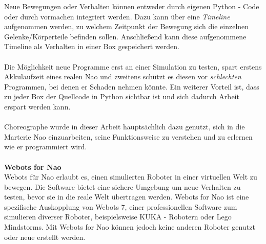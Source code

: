 Neue Bewegungen oder Verhalten können entweder durch eigenen Python - Code oder durch vormachen integriert werden. Dazu kann über eine \textit{Timeline} aufgenommen werden, zu welchem Zeitpunkt der Bewegung sich die einzelnen Gelenke/Körperteile befinden sollen. Anschließend kann diese aufgenommene Timeline als Verhalten in einer Box gespeichert werden.
\\
\\
Die Möglichkeit neue Programme erst an einer Simulation zu testen, spart erstens Akkulaufzeit eines realen Nao und zweitens schützt es diesen vor \textit{schlechten} Programmen, bei denen er Schaden nehmen könnte. Ein weiterer Vorteil ist, dass zu jeder Box der Quellcode in Python sichtbar ist und sich dadurch Arbeit erspart werden kann.
\\
\\
Choreographe wurde in dieser Arbeit hauptsächlich dazu genutzt, sich in die Marterie Nao einzuarbeiten, seine Funktionsweise zu verstehen und zu erlernen wie er programmiert wird.
\\
\\
\textbf{Webots for Nao}
\\
Webots für Nao erlaubt es, einen simulierten Roboter in einer virtuellen Welt zu bewegen. Die Software bietet eine sichere Umgebung um neue Verhalten zu testen, bevor sie in die reale Welt übertragen werden. Webots for Nao ist eine spezifische Auskopplung von Webots 7, einer professionellen Software zum simulieren diverser Roboter, beispielsweise KUKA - Robotern oder Lego Mindstorms. Mit Webots for Nao können jedoch keine anderen Roboter genutzt oder neue erstellt werden.


